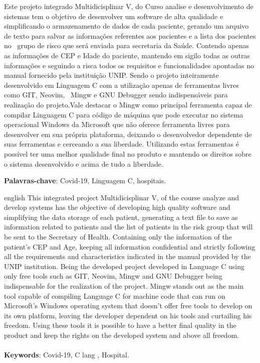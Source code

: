 \documentclass[
	12pt,				%
	oneside,			%
	a4paper,			%
  section=TITLE,
	brazil,				%
	]{abntex2}
\begin{document}
\begin{resumo}

Este projeto integrado Multidicisplinar V, do Curso analise e desenvolvimento
de sistemas tem o objetivo de desenvolver um software de alta qualidade e
simplificando o armazenamento de dados de cada paciente, gerando um arquivo de
texto para salvar as informações referentes aos pacientes e a lista dos
pacientes no  grupo de risco que será enviada para secretaria da Saúde.
Contendo apenas as informações de CEP e Idade do paciente, mantendo em sigilo
todas as outras informações e seguindo a risca todos os requisitos e
funcionalidades apontadas no manual fornecido pela instituição UNIP.  Sendo o
projeto inteiramente desenvolvido em Linguagem C com a utilização apenas de
ferramentas livres como GIT, Neovim,  Mingw e GNU Debugger sendo indispensáveis
para realização do projeto.Vale destacar o Mingw como principal ferramenta
capaz de compilar Linguagem C para código de máquina que pode executar no
sistema operacional Windows da Microsoft que não oferece ferramenta livres para
desenvolver em sua própria plataforma, deixando o desenvolvedor dependente de
suas ferramentas e cerceando a sua liberdade.  Utilizando estas ferramentas é
possível ter uma melhor qualidade final no produto e mantendo os direitos sobre
o sistema desenvolvido e acima de tudo a liberdade.

 \textbf{Palavras-chave}: Covid-19, Linguagem C, hospitais.
\end{resumo}


\begin{resumo}[Abstract]
 \begin{otherlanguage*}{english}
This integrated project Multidicisplinar V, of the course analyze and develop
systems has the objective of developing high quality software and simplifying
the data storage of each patient, generating a text file to save as information
related to patients and the list of patients in the risk group that will be
sent to the Secretary of Health. Containing only the information of the
patient's CEP and Age, keeping all information confidential and strictly
following all the requirements and characteristics indicated in the manual
provided by the UNIP institution. Being the developed project developed in
Language C using only free tools such as GIT, Neovim, Mingw and GNU Debugger
being indispensable for the realization of the project. Mingw stands out as the
main tool capable of compiling Language C for machine code that can run on
Microsoft's Windows operating system that doesn't offer free tools to develop
on its own platform, leaving the developer dependent on his tools and
curtailing his freedom. Using these tools it is possible to have a better final
quality in the product and keep the rights on the developed system and above
all freedom.\\
\\
   \vspace{\onelineskip}
   \noindent
   \textbf{Keywords}: Covid-19, C lang , Hospital.
 \end{otherlanguage*}
\end{resumo}
\end{document}
